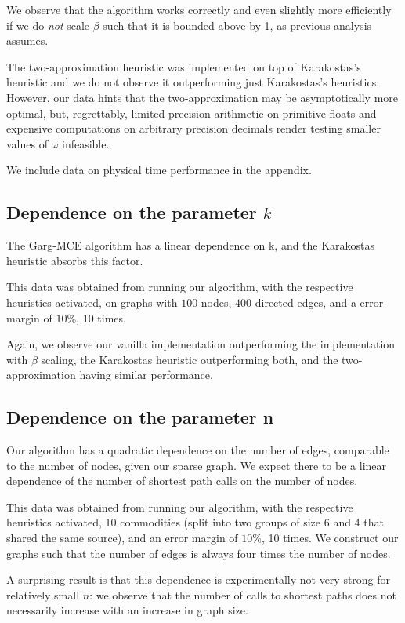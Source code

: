 We observe that the algorithm works correctly and even slightly more efficiently if we do \emph{not} scale $\beta$ such
that it is bounded above by 1, as previous analysis assumes.

The two-approximation heuristic was implemented on top of Karakostas's heuristic and we do not observe it outperforming
just Karakostas's heuristics. However, our data hints that the two-approximation may be asymptotically more optimal,
but, regrettably, limited precision arithmetic on primitive floats and expensive computations on arbitrary precision
decimals render testing smaller values of $\omega$ infeasible.

We include data on physical time performance in the appendix.

\subsection{Dependence on the parameter $k$}

The Garg-MCE algorithm has a linear dependence on k, and the Karakostas heuristic absorbs this factor.


This data was obtained from running our algorithm, with the respective heuristics activated, on graphs with $100$
nodes, $400$ directed edges, and a error margin of $10\%$, 10 times.

Again, we observe our vanilla implementation outperforming the implementation with $\beta$ scaling, the Karakostas
heuristic outperforming both, and the two-approximation having similar performance.

\subsection{Dependence on the parameter n}

Our algorithm has a quadratic dependence on the number of edges, comparable to the number of nodes, given our sparse
graph.  We expect there to be a linear dependence of the number of shortest path calls on the number of nodes.

This data was obtained from running our algorithm, with the respective heuristics activated, 10 commodities (split into
two groups of size 6 and 4 that shared the same source), and an error margin of $10\%$, 10
times. We construct our graphs such that the number of edges is always four times the number of nodes.

A surprising result is that this dependence is experimentally not very strong for relatively small $n$: we observe that
the number of calls to shortest paths does not necessarily increase with an increase in graph size.

